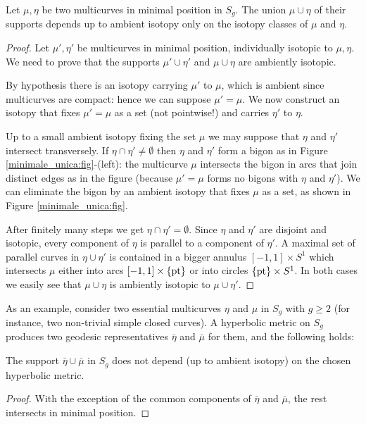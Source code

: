 \begin{prop} \label{minimale:unica:prop}
Let $\mu, \eta$ be two multicurves in minimal position in $S_g$. The union $\mu\cup \eta$ of their supports depends up to ambient isotopy only on the isotopy classes of $\mu$ and $\eta$.
\end{prop}
\begin{proof}
Let $\mu', \eta'$ be multicurves in minimal position, individually isotopic to $\mu, \eta$. We need to prove that the supports $\mu'\cup \eta'$ and $\mu\cup \eta$ are ambiently isotopic.

By hypothesis there is an isotopy carrying $\mu'$ to $\mu$, which is ambient since multicurves are compact: hence we can suppose $\mu' = \mu$. We now construct an isotopy that fixes $\mu'=\mu$ as a set (not pointwise!) and carries $\eta'$ to $\eta$. 

Up to a small ambient isotopy fixing the set $\mu$ we may suppose that $\eta$ and $\eta'$ intersect transversely. If $\eta\cap \eta' \neq \emptyset$ then $\eta$ and $\eta'$ form a bigon as in Figure \ref{minimale_unica:fig}-(left): the multicurve $\mu$ intersects the bigon in arcs that join distinct edges as in the figure (because $\mu' = \mu$ forms no bigons with $\eta$ and $\eta'$). We can eliminate the bigon by an ambient isotopy that fixes $\mu$
as a set, as shown in Figure \ref{minimale_unica:fig}. 

After finitely many steps we get $\eta\cap \eta' = \emptyset$. Since $\eta$ and $\eta'$ are disjoint and isotopic, every component of $\eta$ is parallel to a component of $\eta'$. A maximal set of parallel curves in $\eta \cup \eta'$ is contained in a bigger annulus $[-1,1] \times S^1$ which intersects $\mu$ either into arcs $[-1,1] \times \{{\rm pt}\}$ or into circles $\{{\rm pt}\} \times S^1$. In both cases we easily see that $\mu\cup\eta$ is ambiently isotopic to $\mu\cup \eta'$.
\end{proof}

As an example, consider two essential multicurves $\eta$ and $\mu$ in $S_g$ with $g\geqslant 2$ (for instance, two non-trivial simple closed curves). A hyperbolic metric on $S_g$ produces two geodesic representatives $\bar{\eta}$ and $\bar{\mu}$ for them, and the following holds:
\begin{cor} \label{unica:configurazione:cor}
The support $\bar{\eta}\cup \bar{\mu}$ in $S_g$ does not depend (up to ambient isotopy) on the chosen hyperbolic metric.
\end{cor}
\begin{proof}
With the exception of the common components of $\bar{\eta}$ and $\bar{\mu}$, the rest intersects in minimal position. 
\end{proof}

